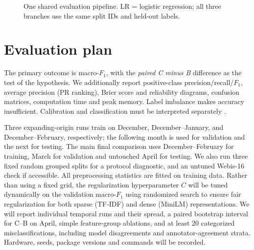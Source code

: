 \documentclass[11pt]{article}
\newcommand{\mF}{macro-\(F_1\)}
\begin{document}
\begin{figure}[t]
\centering
{}
\caption{One shared evaluation pipeline. LR = logistic regression; all three branches use the same split IDs and held-out labels.}
\label{fig:pipeline}
\end{figure}

\section{Evaluation plan}
The primary outcome is \mF{}, with the \emph{paired C minus B} difference as the test of the hypothesis. We additionally report positive-class precision/recall/\(F_1\), average precision (PR ranking), Brier score and reliability diagrams, confusion matrices, computation time and peak memory. Label imbalance makes accuracy insufficient. Calibration and classification must be interpreted separately \cite{guo2017calibration}.

Three expanding-origin runs train on December, December--January, and December--February, respectively; the following month is used for validation and the next for testing. The main final comparison uses December--February for training, March for validation and untouched April for testing. We also run three fixed random grouped splits for a protocol diagnostic, and an untuned Webis-16 check if accessible. All preprocessing statistics are fitted on training data. Rather than using a fixed grid, the regularization hyperparameter \(C\) will be tuned dynamically on the validation \mF{} using randomized search to ensure fair regularization for both sparse (TF-IDF) and dense (MiniLM) representations. We will report individual temporal runs and their spread, a paired bootstrap interval for C--B on April, simple feature-group ablations, and at least 20 categorized misclassifications, including model disagreements and annotator-agreement strata. Hardware, seeds, package versions and commands will be recorded.
\end{document}
